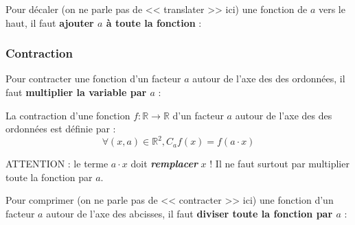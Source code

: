 \documentclass[12pt, a4paper]{article}
\begin{document}
\clearpage


Pour décaler (on ne parle pas de << translater >> ici) une fonction de $a$ vers le haut, il faut \textbf{ajouter $a$ à toute la fonction} :

\begin{center}
\end{center}

\subsubsection{Contraction}

Pour contracter une fonction d'un facteur $a$ autour de l'axe des des ordonnées, il faut \textbf{multiplier la variable par $a$} :

\begin{tcolorbox}
	La contraction d'une fonction $f:\mathbb{R} \to \mathbb{R}$ d'un facteur $a$ autour de l'axe des des ordonnées est définie par :
	\begin{equation*}
		\forall (x, a) \in \mathbb{R}^2, C_{a}f(x) = f(a\cdot x)
	\end{equation*}
	
	ATTENTION : le terme $a \cdot x$ doit \textbf{\emph{remplacer}} $x$ ! Il ne faut surtout par multiplier toute la fonction par $a$.
\end{tcolorbox}

\begin{center}
\end{center}

Pour comprimer (on ne parle pas de << contracter >> ici) une fonction d'un facteur $a$ autour de l'axe des abcisses, il faut \textbf{diviser toute la fonction par $a$} :
\end{document}
